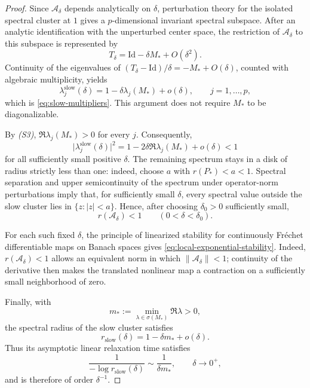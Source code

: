 \documentclass[11pt]{article}
\theoremstyle{definition}
\theoremstyle{remark}
\newcommand{\Id}{\mathrm{Id}}
\begin{document}
\begin{proof}
Since $\mathcal A_\delta$ depends analytically on $\delta$,
perturbation theory for the isolated spectral cluster at $1$
gives a $p$-dimensional invariant spectral subspace.
After an analytic identification with the unperturbed
center space, the restriction of $\mathcal A_\delta$
to this subspace is represented by
\[
  T_\delta=\Id-\delta M_*+O(\delta^2).
\]
Continuity of the eigenvalues of
$(T_\delta-\Id)/\delta=-M_*+O(\delta)$, counted with
algebraic multiplicity, yields
\[
  \lambda_j^{\mathrm{slow}}(\delta)
  =1-\delta\lambda_j(M_*)+o(\delta),
  \qquad j=1,\ldots,p,
\]
which is \eqref{eq:slow-multipliers}.
This argument does not require $M_*$ to be diagonalizable.

By \emph{(S3)}, $\Re\lambda_j(M_*)>0$ for every $j$.
Consequently,
\[
  \bigl|\lambda_j^{\mathrm{slow}}(\delta)\bigr|^2
  =1-2\delta\Re\lambda_j(M_*)+o(\delta)<1
\]
for all sufficiently small positive $\delta$.
The remaining spectrum stays in a disk of radius strictly
less than one: indeed, choose $a$ with $r(P_*)<a<1$.
Spectral separation and upper semicontinuity of the spectrum
under operator-norm perturbations imply that, for sufficiently
small $\delta$, every spectral value outside the slow cluster
lies in $\{z:|z|<a\}$.
Hence, after choosing $\delta_0>0$ sufficiently small,
\[
  r(\mathcal A_\delta)<1
  \qquad (0<\delta<\delta_0).
\]

For each such fixed $\delta$, the principle of linearized
stability for continuously Fréchet differentiable maps on
Banach spaces gives
\eqref{eq:local-exponential-stability}.
Indeed, $r(\mathcal A_\delta)<1$ allows an equivalent norm
in which $\|\mathcal A_\delta\|<1$; continuity of the
derivative then makes the translated nonlinear map a
contraction on a sufficiently small neighborhood of zero.

Finally, with
\[
  m_*:=\min_{\lambda\in\sigma(M_*)}\Re\lambda>0,
\]
the spectral radius of the slow cluster satisfies
\[
  r_{\mathrm{slow}}(\delta)
  =1-\delta m_*+o(\delta).
\]
Thus its asymptotic linear relaxation time satisfies
\[
  \frac{1}{-\log r_{\mathrm{slow}}(\delta)}
  \sim\frac{1}{\delta m_*},
  \qquad \delta\to0^+,
\]
and is therefore of order $\delta^{-1}$.
\end{proof}
\end{document}
